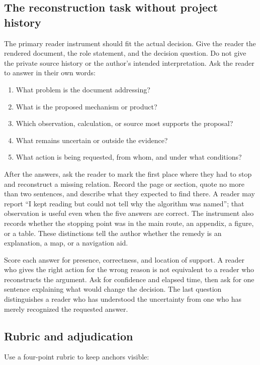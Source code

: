 \subsection{The reconstruction task without project history}

The primary reader instrument should fit the actual decision. Give the reader
the rendered document, the role statement, and the decision question. Do not
give the private source history or the author's intended interpretation. Ask
the reader to answer in their own words:

\begin{enumerate}
\item What problem is the document addressing?
\item What is the proposed mechanism or product?
\item Which observation, calculation, or source most supports the proposal?
\item What remains uncertain or outside the evidence?
\item What action is being requested, from whom, and under what conditions?
\end{enumerate}

After the answers, ask the reader to mark the first place where they had to
stop and reconstruct a missing relation. Record the page or section, quote no
more than two sentences, and describe what they expected to find there. A
reader may report ``I kept reading but could not tell why the algorithm was
named''; that observation is useful even when the five answers are correct.
The instrument also records whether the stopping point was in the main route,
an appendix, a figure, or a table. These distinctions tell the author whether
the remedy is an explanation, a map, or a navigation aid.

Score each answer for presence, correctness, and location of support. A
reader who gives the right action for the wrong reason is not equivalent to a
reader who reconstructs the argument. Ask for confidence and elapsed time,
then ask for one sentence explaining what would change the decision. The last
question distinguishes a reader who has understood the uncertainty from one
who has merely recognized the requested answer.

\subsection{Rubric and adjudication}

Use a four-point rubric to keep anchors visible:

